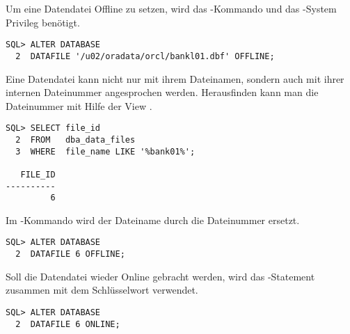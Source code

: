           Um eine Datendatei Offline zu setzen, wird das -Kommando und das -System Privileg ben\"otigt.
          \begin{lstlisting}[caption={Eine Datendatei offline setzen},label=admin1470,language=oracle_sql]
SQL> ALTER DATABASE
  2  DATAFILE '/u02/oradata/orcl/bankl01.dbf' OFFLINE;
          \end{lstlisting}
          Eine Datendatei kann nicht nur mit ihrem Dateinamen, sondern auch mit ihrer internen Dateinummer angesprochen werden. Herausfinden kann man die Dateinummer mit Hilfe der View .
          \begin{lstlisting}[caption={Herausfinden der file\_id einer Datendatei},label=admin1471,language=oracle_sql]
SQL> SELECT file_id
  2  FROM   dba_data_files
  3  WHERE  file_name LIKE '%bank01%';

   FILE_ID
----------
         6
          \end{lstlisting}
          Im -Kommando wird der Dateiname durch die Dateinummer ersetzt.
          \begin{lstlisting}[caption={Eine Datendatei mit Hilfe der file\_id Offline setzen},label=admin1472,language=oracle_sql]
SQL> ALTER DATABASE
  2  DATAFILE 6 OFFLINE;
          \end{lstlisting}
          Soll die Datendatei wieder Online gebracht werden, wird das -Statement zusammen mit dem Schl\"usselwort  verwendet.
          \begin{lstlisting}[caption={Eine Datendatei online setzen},label=admin1473,language=oracle_sql]
SQL> ALTER DATABASE
  2  DATAFILE 6 ONLINE;
          \end{lstlisting}
